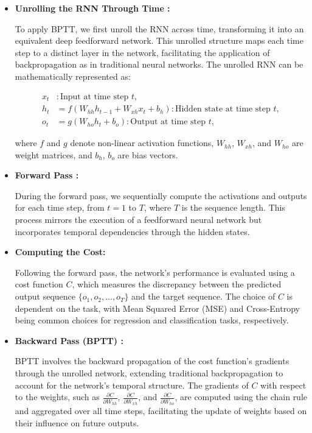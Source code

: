 \begin{itemize}
\item \textbf{Unrolling the RNN Through Time :}

To apply BPTT, we first unroll the RNN across time, transforming it into an equivalent deep feedforward network. 
This unrolled structure maps each time step to a distinct layer in the network, facilitating the application of backpropagation as in traditional neural networks. 
The unrolled RNN can be mathematically represented as:

\begin{align*}
x_t & : \text{Input at time step } t, \\
h_t & = f(W_{hh}h_{t-1} + W_{xh}x_t + b_h) : \text{Hidden state at time step } t, \\
o_t & = g(W_{ho}h_t + b_o) : \text{Output at time step } t,
\end{align*}

where $f$ and $g$ denote non-linear activation functions, $W_{hh}$, $W_{xh}$, and $W_{ho}$ are weight matrices, and $b_h$, $b_o$ are bias vectors.

\item \textbf{Forward Pass :}

During the forward pass, we sequentially compute the activations and outputs for each time step, from $t=1$ to $T$, where $T$ is the sequence length. This process mirrors the execution of a feedforward neural network but incorporates temporal dependencies through the hidden states.

\item \textbf{Computing the Cost:}

Following the forward pass, the network's performance is evaluated using a cost function $C$, which measures the discrepancy between the predicted output sequence $\{o_1, o_2, ..., o_T\}$ and the target sequence. 
The choice of $C$ is dependent on the task, with Mean Squared Error (MSE) and Cross-Entropy being common choices for regression and classification tasks, respectively.

\item \textbf{Backward Pass (BPTT) :}

BPTT involves the backward propagation of the cost function's gradients through the unrolled network, extending traditional backpropagation to account for the network's temporal structure. 
The gradients of $C$ with respect to the weights, such as $\frac{\partial C}{\partial W_{hh}}$, $\frac{\partial C}{\partial W_{xh}}$, and $\frac{\partial C}{\partial W_{ho}}$, are computed using the chain rule and aggregated over all time steps, facilitating the update of weights based on their influence on future outputs.


\end{itemize}
